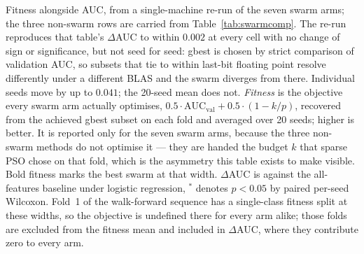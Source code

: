 \begin{table}[htbp]
    \caption{Fitness alongside AUC, from a single-machine re-run of the seven swarm arms; the three non-swarm rows are carried from Table~\ref{tab:swarmcomp}. The re-run reproduces that table's $\Delta$AUC to within $0.002$ at every cell with no change of sign or significance, but not seed for seed: gbest is chosen by strict comparison of validation AUC, so subsets that tie to within last-bit floating point resolve differently under a different BLAS and the swarm diverges from there. Individual seeds move by up to $0.041$; the 20-seed mean does not. \emph{Fitness} is the objective every swarm arm actually optimises, $0.5\cdot\mathrm{AUC}_{\mathrm{val}} + 0.5\cdot(1 - k/p)$, recovered from the achieved gbest subset on each fold and averaged over 20 seeds; higher is better. It is reported only for the seven swarm arms, because the three non-swarm methods do not optimise it --- they are handed the budget $k$ that sparse PSO chose on that fold, which is the asymmetry this table exists to make visible. Bold fitness marks the best swarm at that width. $\Delta$AUC is against the all-features baseline under logistic regression, $^{*}$ denotes $p < 0.05$ by paired per-seed Wilcoxon. Fold~1 of the walk-forward sequence has a single-class fitness split at these widths, so the objective is undefined there for every arm alike; those folds are excluded from the fitness mean and included in $\Delta$AUC, where they contribute zero to every arm.}
    \label{tab:swarmfitness}
\end{table}
